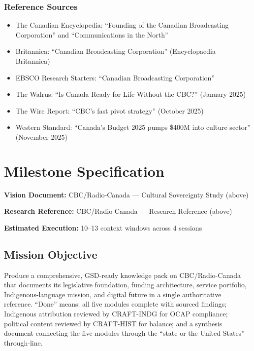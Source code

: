 \documentclass[11pt,letterpaper]{article}
\newcommand{\stageheader}[2]{%
  \noindent\colorbox{#2}{\makebox[\textwidth][l]{%
    \textcolor{white}{\bfseries\sffamily\hspace{6pt}#1\hspace{6pt}}}}%
  \vspace{0.5em}\par%
}
\newcommand{\metafield}[2]{\textbf{\sffamily #1} #2\par}
\begin{document}
\subsubsection{Reference Sources}
\begin{itemize}[noitemsep]
\item The Canadian Encyclopedia: ``Founding of the Canadian Broadcasting Corporation'' and ``Communications in the North''
\item Britannica: ``Canadian Broadcasting Corporation'' (Encyclopaedia Britannica)
\item EBSCO Research Starters: ``Canadian Broadcasting Corporation''
\item The Walrus: ``Is Canada Ready for Life Without the CBC?'' (January 2025)
\item The Wire Report: ``CBC's fast pivot strategy'' (October 2025)
\item Western Standard: ``Canada's Budget 2025 pumps \$400M into culture sector'' (November 2025)
\end{itemize}

\newpage

\stageheader{STAGE 3 --- MISSION PACKAGE}{tertiary}

\section{Milestone Specification}

\metafield{Vision Document:}{CBC/Radio-Canada --- Cultural Sovereignty Study (above)}
\metafield{Research Reference:}{CBC/Radio-Canada --- Research Reference (above)}
\metafield{Estimated Execution:}{10--13 context windows across 4 sessions}

\subsection{Mission Objective}

Produce a comprehensive, GSD-ready knowledge pack on CBC/Radio-Canada that documents its legislative foundation, funding architecture, service portfolio, Indigenous-language mission, and digital future in a single authoritative reference. ``Done'' means: all five modules complete with sourced findings; Indigenous attribution reviewed by CRAFT-INDG for OCAP compliance; political content reviewed by CRAFT-HIST for balance; and a synthesis document connecting the five modules through the ``state or the United States'' through-line.
\end{document}
